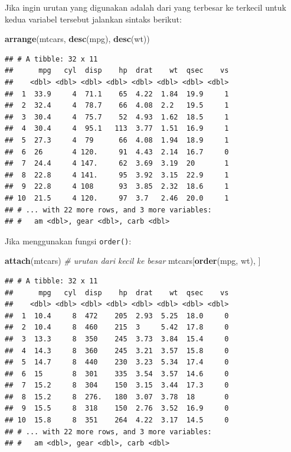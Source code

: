 \documentclass[]{book}
\newenvironment{Shaded}{\begin{snugshade}}{\end{snugshade}}
\newcommand{\KeywordTok}[1]{\textcolor[rgb]{0.13,0.29,0.53}{\textbf{#1}}}
\newcommand{\CommentTok}[1]{\textcolor[rgb]{0.56,0.35,0.01}{\textit{#1}}}
\newcommand{\NormalTok}[1]{#1}
\begin{document}
Jika ingin urutan yang digunakan adalah dari yang terbesar ke terkecil
untuk kedua variabel tersebut jalankan sintaks berikut:

\begin{Shaded}
\begin{Highlighting}[]
\KeywordTok{arrange}\NormalTok{(mtcars, }\KeywordTok{desc}\NormalTok{(mpg), }\KeywordTok{desc}\NormalTok{(wt))}
\end{Highlighting}
\end{Shaded}

\begin{verbatim}
## # A tibble: 32 x 11
##      mpg   cyl  disp    hp  drat    wt  qsec    vs
##    <dbl> <dbl> <dbl> <dbl> <dbl> <dbl> <dbl> <dbl>
##  1  33.9     4  71.1    65  4.22  1.84  19.9     1
##  2  32.4     4  78.7    66  4.08  2.2   19.5     1
##  3  30.4     4  75.7    52  4.93  1.62  18.5     1
##  4  30.4     4  95.1   113  3.77  1.51  16.9     1
##  5  27.3     4  79      66  4.08  1.94  18.9     1
##  6  26       4 120.     91  4.43  2.14  16.7     0
##  7  24.4     4 147.     62  3.69  3.19  20       1
##  8  22.8     4 141.     95  3.92  3.15  22.9     1
##  9  22.8     4 108      93  3.85  2.32  18.6     1
## 10  21.5     4 120.     97  3.7   2.46  20.0     1
## # ... with 22 more rows, and 3 more variables:
## #   am <dbl>, gear <dbl>, carb <dbl>
\end{verbatim}

Jika menggunakan fungsi \texttt{order()}:

\begin{Shaded}
\begin{Highlighting}[]
\KeywordTok{attach}\NormalTok{(mtcars)}
\CommentTok{# urutan dari kecil ke besar}
\NormalTok{mtcars[}\KeywordTok{order}\NormalTok{(mpg, wt), ]}
\end{Highlighting}
\end{Shaded}

\begin{verbatim}
## # A tibble: 32 x 11
##      mpg   cyl  disp    hp  drat    wt  qsec    vs
##    <dbl> <dbl> <dbl> <dbl> <dbl> <dbl> <dbl> <dbl>
##  1  10.4     8  472    205  2.93  5.25  18.0     0
##  2  10.4     8  460    215  3     5.42  17.8     0
##  3  13.3     8  350    245  3.73  3.84  15.4     0
##  4  14.3     8  360    245  3.21  3.57  15.8     0
##  5  14.7     8  440    230  3.23  5.34  17.4     0
##  6  15       8  301    335  3.54  3.57  14.6     0
##  7  15.2     8  304    150  3.15  3.44  17.3     0
##  8  15.2     8  276.   180  3.07  3.78  18       0
##  9  15.5     8  318    150  2.76  3.52  16.9     0
## 10  15.8     8  351    264  4.22  3.17  14.5     0
## # ... with 22 more rows, and 3 more variables:
## #   am <dbl>, gear <dbl>, carb <dbl>
\end{verbatim}
\end{document}
